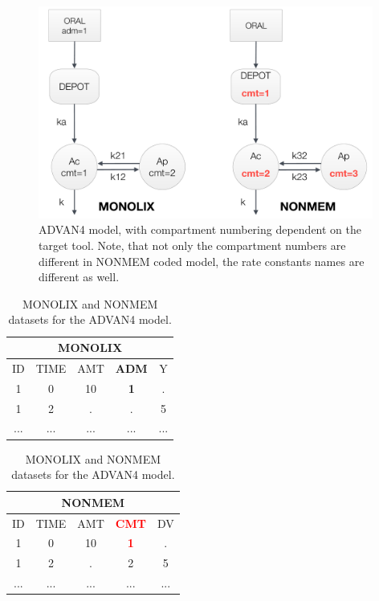 \begin{figure}[htbp!]
\centering
 \includegraphics[width=110mm]{pics/Advan4.pdf}
\caption{ADVAN4 model, with compartment numbering dependent on the target tool. 
Note, that not only the compartment numbers are different in NONMEM coded model, 
the rate constants names are different as well.}
\label{fig:Advan4}
\end{figure}


\begin{table}[ht!]
\footnotesize
\parbox{.5\linewidth}{
\centering
\begin{tabular}{ccccc}
  \hline
   \multicolumn{5}{c}{\textbf{MONOLIX}} \\
  \hline
ID & TIME & AMT & \textbf{ADM} & Y \\
  \hline
1  & 0        & 10   & \textbf{1} & .       \\
1  & 2        & .      & . & 5        \\
... &  ...      &  ...   &  ...&  ...     \\
\end{tabular}
}
\hfill
\parbox{.5\linewidth}{
\centering
\begin{tabular}{ccccc}
  \hline
   \multicolumn{5}{c}{\textbf{NONMEM}} \\
  \hline
ID & TIME & AMT & \textbf{\textcolor{red}{CMT}} & DV \\
  \hline
1  & 0        & 10   & \textbf{\textcolor{red}{1}}   & .    \\
1  & 2        & .      & 2    & 5   \\
... &  ...      &  ...   &  ... & ...  \\
\end{tabular}
}
\caption{MONOLIX and NONMEM datasets for the ADVAN4 model.}
\end{table}

